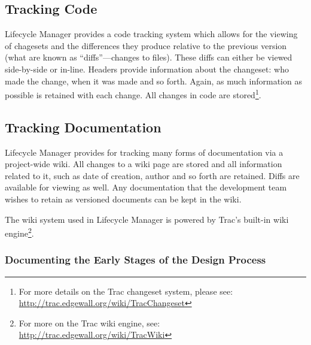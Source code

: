 \documentclass[letterpaper,10pt]{article}
\begin{document}
		\subsection{Tracking Code}
	
                Lifecycle Manager provides a code tracking system
                which allows for the viewing of chagesets and the
                differences they produce relative to the previous
                version (what are known as ``diffs''---changes to
                files).  These diffs can either be viewed side-by-side
                or in-line.  Headers provide information about the
                changeset: who made the change, when it was made and
                so forth.  Again, as much information as possible is
                retained with each change.  All changes in code are
                stored\footnote{For more details on the Trac changeset
                  system, please see:
                  \url{http://trac.edgewall.org/wiki/TracChangeset}}.
	
		\subsection{Tracking Documentation}


            Lifecycle Manager provides for tracking many forms of 
            documentation via a project-wide wiki.  All changes to a wiki page are stored 
            and all information related to it, such as date of creation, 
            author and so forth are retained.  Diffs are available 
            for viewing as well.  Any documentation that the development 
            team wishes to retain as versioned documents can be kept in the 
            wiki.

            The wiki system used in Lifecycle Manager is powered by
            Trac's built-in wiki engine\footnote{For more on
              the Trac wiki engine, see:
              \url{http://trac.edgewall.org/wiki/TracWiki}}.

            \subsubsection{Documenting the Early Stages of the Design Process}
\end{document}
